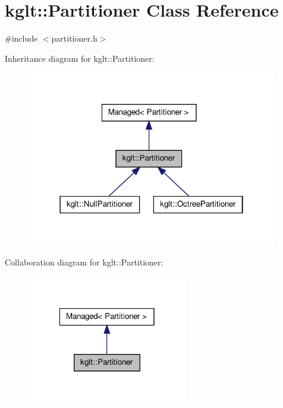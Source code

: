 \hypertarget{classkglt_1_1_partitioner}{\section{kglt\-:\-:Partitioner Class Reference}
\label{classkglt_1_1_partitioner}
}


{\ttfamily \#include $<$partitioner.\-h$>$}



Inheritance diagram for kglt\-:\-:Partitioner\-:\nopagebreak
\begin{figure}[H]
\begin{center}
\leavevmode
\includegraphics[width=310pt]{classkglt_1_1_partitioner__inherit__graph}
\end{center}
\end{figure}


Collaboration diagram for kglt\-:\-:Partitioner\-:\nopagebreak
\begin{figure}[H]
\begin{center}
\leavevmode
\includegraphics[width=198pt]{classkglt_1_1_partitioner__coll__graph}
\end{center}
\end{figure}
